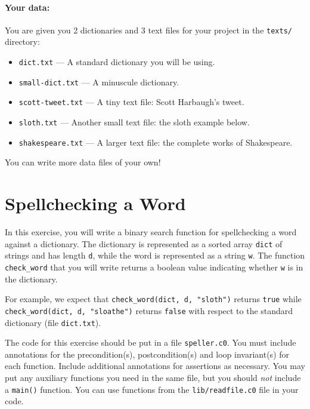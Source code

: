 \documentclass[12pt]{exam}
\begin{document}
\paragraph{Your data:} You are given you 2 dictionaries and 3 text
files for your project in the \lstinline'texts/' directory:
\begin{itemize}
\itemsep=0pt
\item \lstinline'dict.txt' --- %
  A standard dictionary you will be using.
\item \lstinline'small-dict.txt' --- %
  A minuscule dictionary.
\item \lstinline'scott-tweet.txt' --- %
  A tiny text file: Scott Harbaugh's tweet.
\item \lstinline'sloth.txt' --- %
  Another small text file: the sloth example below.
\item \lstinline'shakespeare.txt' --- %
  A larger text file: the complete works of Shakespeare.
\end{itemize}
You can write more data files of your own!


\section{Spellchecking a Word}

In this exercise, you will write a binary search function for
spellchecking a word against a dictionary.  The dictionary is
represented as a sorted array \lstinline'dict' of strings and has
length \lstinline'd', while the word is represented as a string
\lstinline'w'.  The function \lstinline'check_word' that you will
write returns a boolean value indicating whether \lstinline'w' is in
the dictionary.

For example, we expect that \lstinline'check_word(dict, d, "sloth")'
returns \lstinline'true' while %
\lstinline'check_word(dict, d, "sloathe")' %
returns \lstinline'false' with respect to the standard dictionary
(file \lstinline'dict.txt').

The code for this exercise should be put in a file
\lstinline'speller.c0'. You must include annotations for the
precondition(s), postcondition(s) and loop invariant(s) for each
function.  Include additional annotations for assertions as necessary.
You may put any auxiliary functions you need in the same file, but you
should \emph{not} include a \lstinline'main()' function.  You can use
functions from the \lstinline'lib/readfile.c0' file in your code.
\end{document}
